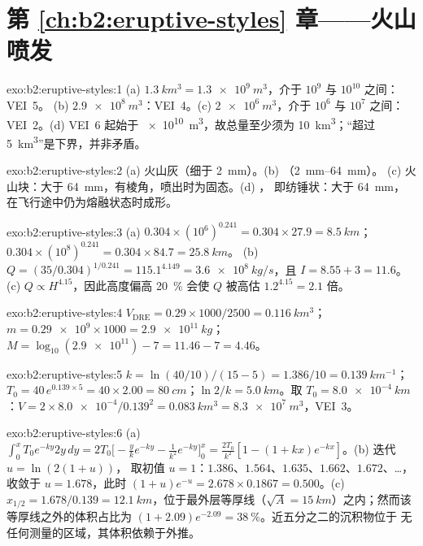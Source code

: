 \section*{第 \ref{ch:b2:eruptive-styles} 章——火山喷发}

\begin{solution}{exo:b2:eruptive-styles:1}
(a) $\qty{1.3}{km^3} = \qty{1.3e9}{m^3}$，介于 $10^9$ 与 $10^{10}$ 之间：VEI~5。
(b) $\qty{2.9e8}{m^3}$：VEI~4。(c) $\qty{2e6}{m^3}$，介于 $10^6$ 与 $10^7$ 之间：
VEI~2。(d) VEI~6 起始于 \qty{e10}{m^3}，故总量至少须为
\qty{10}{km^3}；“超过 \qty{5}{km^3}”是下界，并非矛盾。
\end{solution}

\begin{solution}{exo:b2:eruptive-styles:2}
(a) 火山灰（细于 \qty{2}{mm}）。(b) （\qtyrange{2}{64}{mm}）。
(c) 火山块：大于 \qty{64}{mm}，有棱角，喷出时为固态。(d) ，
即纺锤状：大于 \qty{64}{mm}，
在飞行途中仍为熔融状态时成形。
\end{solution}

\begin{solution}{exo:b2:eruptive-styles:3}
(a) $0.304\times(10^6)^{0.241} = 0.304\times27.9 = \qty{8.5}{km}$；
$0.304\times(10^8)^{0.241} = 0.304\times84.7 = \qty{25.8}{km}$。
(b) $Q = (35/0.304)^{1/0.241} = 115.1^{4.149} = \qty{3.6e8}{kg/s}$，且 $I =
8.55 + 3 = 11.6$。(c) $Q \propto H^{4.15}$，因此高度偏高 \qty{20}{\percent}
会使 $Q$ 被高估 $1.2^{4.15} = 2.1$ 倍。
\end{solution}

\begin{solution}{exo:b2:eruptive-styles:4}
$V_{\mathrm{DRE}} = 0.29\times1000/2500 = \qty{0.116}{km^3}$；$m =
\num{0.29e9}\times1000 = \qty{2.9e11}{kg}$；$M = \log_{10}(\num{2.9e11}) - 7 = 11.46
- 7 = 4.46$。
\end{solution}

\begin{solution}{exo:b2:eruptive-styles:5}
$k = \ln(40/10)/(15 - 5) = 1.386/10 = \qty{0.139}{km^{-1}}$；$T_0 = 40\,e^{0.139\times5}
= 40\times2.00 = \qty{80}{cm}$；$\ln2/k = \qty{5.0}{km}$。取 $T_0 =
\qty{8.0e-4}{km}$：$V = 2\times\num{8.0e-4}/0.139^2 = \qty{0.083}{km^3} =
\qty{8.3e7}{m^3}$，VEI~3。
\end{solution}

\begin{solution}{exo:b2:eruptive-styles:6}
(a) $\int_0^x T_0e^{-ky}2y\,dy = 2T_0\big[-\tfrac{y}{k}e^{-ky} - \tfrac{1}{k^2}e^{-ky}\big]_0^x
= \tfrac{2T_0}{k^2}[1 - (1 + kx)e^{-kx}]$。(b) 迭代 $u = \ln(2(1 + u))$，
取初值 $u = 1$：$1.386$、$1.564$、$1.635$、$1.662$、$1.672$、\dots，收敛于
$u = 1.678$，此时 $(1 + u)e^{-u} = 2.678\times0.1867 = 0.500$。(c) $x_{1/2} =
1.678/0.139 = \qty{12.1}{km}$，位于最外层等厚线（$\sqrt A =
\qty{15}{km}$）之内；然而该等厚线之外的体积占比为 $(1 + 2.09)e^{-2.09} =
\qty{38}{\percent}$。近五分之二的沉积物位于
无任何测量的区域，其体积依赖于外推。
\end{solution}

